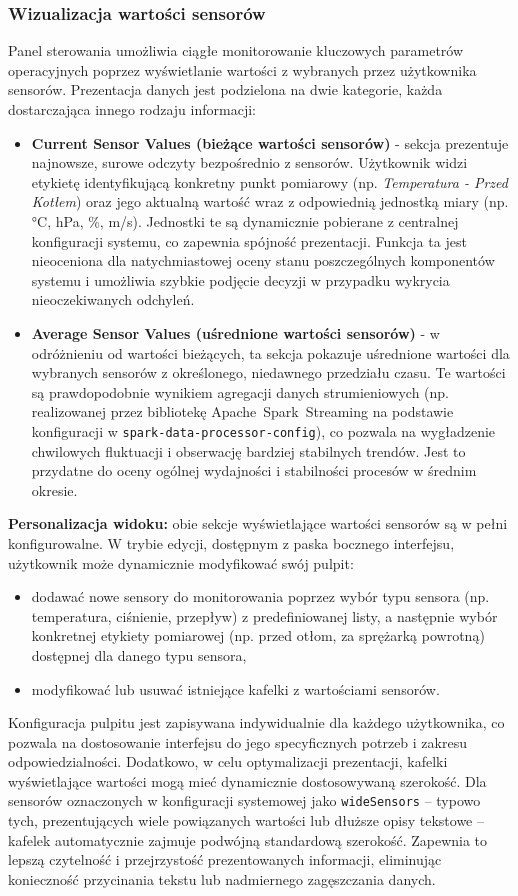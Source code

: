 \subsubsection{Wizualizacja wartości sensorów}
Panel sterowania umożliwia ciągłe monitorowanie kluczowych parametrów operacyjnych poprzez wyświetlanie wartości z wybranych przez użytkownika sensorów. Prezentacja danych jest podzielona na dwie kategorie, każda dostarczająca innego rodzaju informacji:
\begin{itemize}
    \item \textbf{Current Sensor Values (bieżące wartości sensorów)} - sekcja prezentuje najnowsze, surowe odczyty bezpośrednio z sensorów. Użytkownik widzi etykietę identyfikującą konkretny punkt pomiarowy (np. \textit{Temperatura - Przed Kotłem}) oraz jego aktualną wartość wraz z odpowiednią jednostką miary (np. °C, hPa, \%, m/s). Jednostki te są dynamicznie pobierane z centralnej konfiguracji systemu, co zapewnia spójność prezentacji. Funkcja ta jest nieoceniona dla natychmiastowej oceny stanu poszczególnych komponentów systemu i umożliwia szybkie podjęcie decyzji w przypadku wykrycia nieoczekiwanych odchyleń.
    \item \textbf{Average Sensor Values (uśrednione wartości sensorów)} - w odróżnieniu od wartości bieżących, ta sekcja pokazuje uśrednione wartości dla wybranych sensorów z określonego, niedawnego przedziału czasu. Te wartości są prawdopodobnie wynikiem agregacji danych strumieniowych (np. realizowanej przez bibliotekę \mbox{Apache Spark Streaming} na podstawie konfiguracji w \texttt{spark-data-processor-config}), co pozwala na wygładzenie chwilowych fluktuacji i obserwację bardziej stabilnych trendów. Jest to przydatne do oceny ogólnej wydajności i stabilności procesów w średnim okresie.
\end{itemize}
\textbf{Personalizacja widoku:} obie sekcje wyświetlające wartości sensorów są w pełni konfigurowalne. W trybie edycji, dostępnym z paska bocznego interfejsu, użytkownik może dynamicznie modyfikować swój pulpit:
\begin{itemize}
    \item dodawać nowe sensory do monitorowania poprzez wybór typu sensora (np. temperatura, ciśnienie, przepływ) z predefiniowanej listy, a następnie wybór konkretnej etykiety pomiarowej (np. przed otłom, za sprężarką powrotną) dostępnej dla danego typu sensora,
    \item modyfikować lub usuwać istniejące kafelki z wartościami sensorów.
\end{itemize}
Konfiguracja pulpitu jest zapisywana indywidualnie dla każdego użytkownika, co pozwala na dostosowanie interfejsu do jego specyficznych potrzeb i zakresu odpowiedzialności. Dodatkowo, w celu optymalizacji prezentacji, kafelki wyświetlające wartości mogą mieć dynamicznie dostosowywaną szerokość. Dla sensorów oznaczonych w konfiguracji systemowej jako \texttt{wideSensors} – typowo tych, prezentujących wiele powiązanych wartości lub dłuższe opisy tekstowe – kafelek automatycznie zajmuje podwójną standardową szerokość. Zapewnia to lepszą czytelność i przejrzystość prezentowanych informacji, eliminując konieczność przycinania tekstu lub nadmiernego zagęszczania danych.

